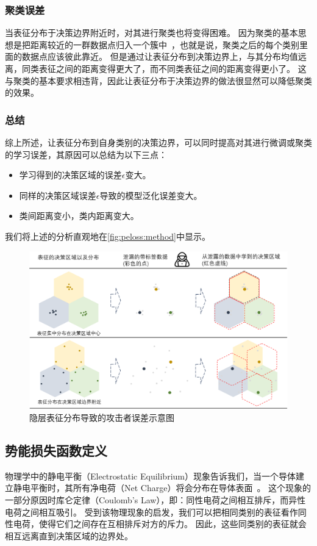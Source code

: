 %
\subsubsection{聚类误差}
当表征分布于决策边界附近时，对其进行聚类也将变得困难。
%
因为聚类的基本思想是把距离较近的一群数据点归入一个簇中~\cite{saxena2017cluster_review,murtagh_2012_cluster}，也就是说，聚类之后的每个类别里面的数据点应该彼此靠近。
%
但是通过让表征分布到决策边界上，与其分布均值远离，同类表征之间的距离变得更大了，而不同类表征之间的距离变得更小了。
%
这与聚类的基本要求相违背，因此让表征分布于决策边界的做法很显然可以降低聚类的效果。


\subsubsection{总结}
综上所述，让表征分布到自身类别的决策边界，可以同时提高对其进行微调或聚类的学习误差，其原因可以总结为以下三点：
\begin{itemize}
    \item 学习得到的决策区域的误差$\epsilon$变大。
    \item 同样的决策区域误差$\epsilon$导致的模型泛化误差变大。
    \item 类间距离变小，类内距离变大。
\end{itemize}
我们将上述的分析直观地在\autoref{fig:peloss:method}中显示。

\begin{figure}[h!]
    \centering
    \includegraphics[width=1\linewidth]{Z_Resources/peloss_method.png}
    \caption{隐层表征分布导致的攻击者误差示意图}
    \label{fig:peloss:method}
\end{figure}


\subsection{势能损失函数定义}
物理学中的静电平衡（Electrostatic Equilibrium）现象告诉我们，当一个导体建立静电平衡时，其所有净电荷（Net Charge）将会分布在导体表面~\cite{griffiths2005introduction}。
%
这个现象的一部分原因时库仑定律（Coulomb's Law），即：同性电荷之间相互排斥，而异性电荷之间相互吸引。
%
受到该物理现象的启发，我们可以把相同类别的表征看作同性电荷，使得它们之间存在互相排斥对方的斥力。
因此，这些同类别的表征就会相互远离直到决策区域的边界处。
%

